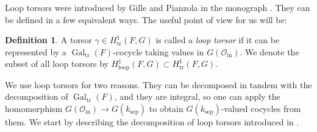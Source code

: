 \documentclass[12pt]{amsart}
\numberwithin{equation}{section}
\theoremstyle{definition}
\newtheorem{definition}[theorem]{Definition}
\newcommand{\cO}{\mathcal{O}}
\newcommand{\Gal}{\operatorname{Gal}}
\newcommand{\sep}{\operatorname{sep}}
\newcommand{\tr}{\operatorname{tr}}
\newcommand{\ksep}{k_{\sep}}
\newcommand{\oin}{\operatorname{in}}
\newcommand{\Oin}{\cO_{\oin}}
\newcommand{\Galtr}{\Gal_{\tr}}
\newcommand{\lop}{\operatorname{loop}}
\begin{document}
Loop torsors were introduced by Gille and Pianzola in the monograph \cite{gille2013torsors}. They can be defined in a few equivalent ways. The useful point of view for us will be:

\begin{definition}
    A torsor $\gamma\in H^1_{\tr}(F,G)$ is called a \emph{loop torsor} if it can be represented by a $\Galtr(F)$-cocycle taking values in $G(\Oin)$. We denote the subset of all loop torsors by $H^1_{\lop}(F,G) \subset H^1_{\tr}(F,G)$.
\end{definition}

We use loop torsors for two reasons. They can be decomposed in tandem with the decomposition of $\Galtr(F)$, and they are integral, so one can apply the homomorphism $G(\Oin)\to G(\ksep)$ to obtain $G(\ksep)$-valued cocycles from them. We start by describing the decomposition of loop torsors introduced in \cite[Section 3.3]{gille2013torsors}. 
\end{document}
